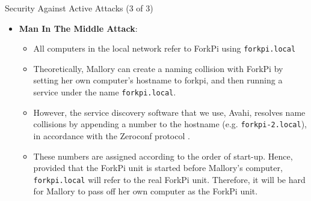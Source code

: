 \begin{frame}{Security Against Active Attacks (3 of 3)}
\begin{itemize}
    \item<1-> \textbf{Man In The Middle Attack}:
    \begin{itemize}
    	\item<2-> All computers in the local network refer to ForkPi using \texttt{forkpi.local}
    	\item<3-> Theoretically, Mallory can create a naming collision with ForkPi by setting her own computer’s hostname to forkpi, and then running a service under the name \texttt{forkpi.local}.
    	\item<4-> However, the service discovery software that we use, Avahi, resolves name collisions by appending a number to the hostname (e.g. \texttt{forkpi-2.local}), in accordance with the Zeroconf protocol .
    	\item<5-> These numbers are assigned according to the order of start-up. Hence, provided that the ForkPi unit is started before Mallory's computer, \texttt{forkpi.local} will refer to the real ForkPi unit. Therefore, it will be hard for Mallory to pass off her own computer as the ForkPi unit.
    \end{itemize}
\end{itemize}
\end{frame}

